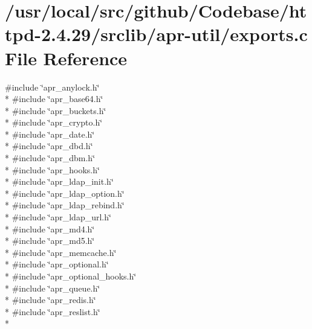 \hypertarget{srclib_2apr-util_2exports_8c}{}\section{/usr/local/src/github/\+Codebase/httpd-\/2.4.29/srclib/apr-\/util/exports.c File Reference}
\label{srclib_2apr-util_2exports_8c}
{\ttfamily \#include \char`\"{}apr\+\_\+anylock.\+h\char`\"{}}\\*
{\ttfamily \#include \char`\"{}apr\+\_\+base64.\+h\char`\"{}}\\*
{\ttfamily \#include \char`\"{}apr\+\_\+buckets.\+h\char`\"{}}\\*
{\ttfamily \#include \char`\"{}apr\+\_\+crypto.\+h\char`\"{}}\\*
{\ttfamily \#include \char`\"{}apr\+\_\+date.\+h\char`\"{}}\\*
{\ttfamily \#include \char`\"{}apr\+\_\+dbd.\+h\char`\"{}}\\*
{\ttfamily \#include \char`\"{}apr\+\_\+dbm.\+h\char`\"{}}\\*
{\ttfamily \#include \char`\"{}apr\+\_\+hooks.\+h\char`\"{}}\\*
{\ttfamily \#include \char`\"{}apr\+\_\+ldap\+\_\+init.\+h\char`\"{}}\\*
{\ttfamily \#include \char`\"{}apr\+\_\+ldap\+\_\+option.\+h\char`\"{}}\\*
{\ttfamily \#include \char`\"{}apr\+\_\+ldap\+\_\+rebind.\+h\char`\"{}}\\*
{\ttfamily \#include \char`\"{}apr\+\_\+ldap\+\_\+url.\+h\char`\"{}}\\*
{\ttfamily \#include \char`\"{}apr\+\_\+md4.\+h\char`\"{}}\\*
{\ttfamily \#include \char`\"{}apr\+\_\+md5.\+h\char`\"{}}\\*
{\ttfamily \#include \char`\"{}apr\+\_\+memcache.\+h\char`\"{}}\\*
{\ttfamily \#include \char`\"{}apr\+\_\+optional.\+h\char`\"{}}\\*
{\ttfamily \#include \char`\"{}apr\+\_\+optional\+\_\+hooks.\+h\char`\"{}}\\*
{\ttfamily \#include \char`\"{}apr\+\_\+queue.\+h\char`\"{}}\\*
{\ttfamily \#include \char`\"{}apr\+\_\+redis.\+h\char`\"{}}\\*
{\ttfamily \#include \char`\"{}apr\+\_\+reslist.\+h\char`\"{}}\\*
